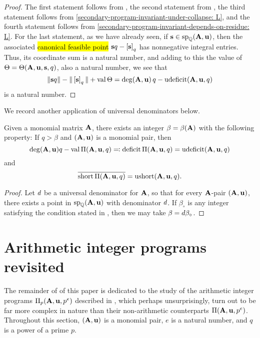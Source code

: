 \documentclass{article}
\begin{document}
\begin{proof}
   The first statement follows from , the second statement from , the third statement follows from \ref{secondary-program-invariant-under-collapse: L},  and the fourth statement follows from \ref{secondary-program-invariant-depends-on-residue: L}.
   For the last statement, as we have already seen, if $\mathbf{s} \in \operatorname{sp}_{\mathbb{Q}}(\mathbf{A}, \mathbf{u})$, then the associated \hl{canonical feasible point} $\mathbf{s}q - \left[ \mathbf{s} \right]_q$ has nonnegative integral entries.
   Thus, its coordinate sum is a natural number, and adding to this the value of $\Theta = \Theta(\mathbf{A}, \mathbf{u}, \mathbf{s}, q)$, also a natural number, we see that 
\[ \| \mathbf{s}q \| - \| \left[ \mathbf{s} \right]_q \| + \operatorname{val} \Theta = \deg(\mathbf{A}, \mathbf{u}) \, q - \operatorname{udeficit}(\mathbf{A}, \mathbf{u}, q) \] is a natural number.
\end{proof}

We record another application of universal denominators below.

\begin{theorem}
\label{uniform uniform value and image: T}
Given a monomial matrix $\mathbf{A}$, there exists an integer $\beta = \beta(\mathbf{A})$ with the following property\textup:
If $q > \beta$ and $(\mathbf{A}, \mathbf{u})$ is a monomial pair, then
\[  \operatorname{deg}(\mathbf{A},\mathbf{u}) q - \operatorname{val} \Pi(\mathbf{A}, \mathbf{u}, q) \eqqcolon \operatorname{deficit} \Pi(\mathbf{A}, \mathbf{u}, q) = \operatorname{udeficit}(\mathbf{A}, \mathbf{u}, q) \]
and
\[  \overline{ \operatorname{short} \Pi(\mathbf{A}, \mathbf{u}, q)} = \operatorname{ushort} (\mathbf{A}, \mathbf{u}, q).\]
\end{theorem}

\begin{proof}
   Let $d$ be a universal denominator for $\mathbf{A}$, so that for every $\mathbf{A}$-pair $(\mathbf{A}, \mathbf{u})$, there exists a point in $\operatorname{sp}_{\mathbb{Q}}(\mathbf{A}, \mathbf{u})$ with denominator $d$.
   If $\beta_{\circ}$  is any integer satisfying the condition stated in , then we may take $\beta = d \beta_{\circ}$.
\end{proof}

\section{Arithmetic integer programs revisited}

The remainder of  of this paper is dedicated to the study of the arithmetic integer programs $\Pi_p(\mathbf{A}, \mathbf{u}, p^e)$ described in , which perhaps unsurprisingly, turn out to be far more complex in nature than their non-arithmetic counterparts $\Pi(\mathbf{A}, \mathbf{u}, p^e)$.
Throughout this section, $(\mathbf{A},\mathbf{u})$ is a monomial pair, $e$ is a natural number, and $q$ is a power of a prime $p$.
\end{document}
